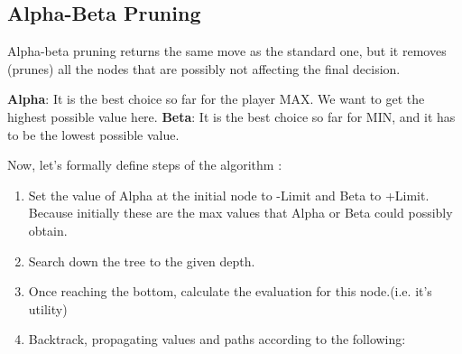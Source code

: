 \documentclass[11pt]{article}
\begin{document}
\subsection{Alpha-Beta Pruning}
Alpha-beta pruning returns the same move as the standard one, but it removes (prunes) all the nodes that are possibly not affecting the final decision.

\textbf{Alpha}: It is the best choice so far for the player MAX. We want to get the highest possible value here.\linebreak
\textbf{Beta}: It is the best choice so far for MIN, and it has to be the lowest possible value.

Now, let's formally define steps of the algorithm :

\begin{enumerate}
\item Set the value of Alpha at the initial node to -Limit and Beta to +Limit. Because initially these are the max values that Alpha or Beta could possibly obtain.
    \item Search down the tree to the given depth.
    \item Once reaching the bottom, calculate the evaluation for this node.(i.e. it's utility)
    \item Backtrack, propagating values and paths according to the following:
    \begin{itemize}
        

\end{itemize}
\end{enumerate}
\end{document}
